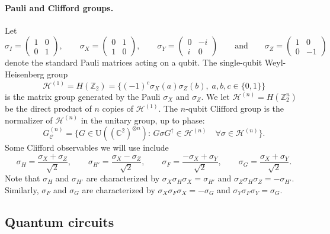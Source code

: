 \documentclass[11pt,letter]{article}
\theoremstyle{remark}
\theoremstyle{definition}
\newcommand{\setft}[1]{\mathrm{#1}}
\newcommand{\Unitary}{\setft{U}}
\newcommand{\C}{\ensuremath{\mathbb{C}}}
\newcommand{\Z}{\ensuremath{\mathbb{Z}}}
\newcommand{\heisg}{{\mathcal{H}^{(1)}}}
\newcommand{\heisgn}{{\mathcal{H}^{(n)}}}
\newcommand{\cliffordn}{G_\mathcal{C}^{(n)}}
\begin{document}
\paragraph{Pauli and Clifford groups.}
Let 
\begin{equation}\label{eq:pauli-matrix}
\sigma_I = \begin{pmatrix} 1 & 0 \\ 0 & 1 \end{pmatrix},\qquad \sigma_X = \begin{pmatrix} 0 & 1 \\ 1 & 0 \end{pmatrix},\qquad \sigma_Y = \begin{pmatrix} 0 & -i \\ i & 0 \end{pmatrix}\qquad\text{and}\qquad \sigma_Z = \begin{pmatrix} 1 & 0 \\ 0 & -1\end{pmatrix}
\end{equation}
denote the standard Pauli matrices acting on a qubit.  The single-qubit Weyl-Heisenberg group
$$\heisg = H(\Z_2)=\Big\{(-1)^c\sigma_X(a)\sigma_Z(b),\;a,b,c\in\{0,1\}\Big\} $$
is the matrix group generated by the Pauli $\sigma_X$ and $\sigma_Z$. We let $\heisgn = H(\Z_2^n)$ be the direct product of $n$ copies of $\heisg$.  
The $n$-qubit Clifford group is the normalizer of $\heisgn$ in the unitary group, up to phase: 
$$\cliffordn = \big\{G\in\Unitary((\C^2)^{\otimes n}):\, G \sigma G^\dagger \in \heisgn \quad\forall \sigma \in \heisgn\big\}.$$
Some Clifford observables we will use include 
\begin{equation}\label{eq:pauli-matrix-2}
 \sigma_H = \frac{\sigma_X+\sigma_Z}{\sqrt{2}},\qquad \sigma_{H'} = \frac{\sigma_X-\sigma_Z}{\sqrt{2}},\qquad \sigma_F = \frac{-\sigma_X+\sigma_Y}{\sqrt{2}},\qquad \sigma_{G} = \frac{\sigma_X+\sigma_Y}{\sqrt{2}}.
\end{equation}
Note that  $\sigma_H$ and $\sigma_{H'}$ are characterized by $\sigma_X \sigma_H \sigma_X = \sigma_{H'}$ and $\sigma_Z \sigma_H \sigma_Z = -\sigma_{H'}$. Similarly, $\sigma_F$ and $\sigma_G$ are characterized by $\sigma_X \sigma_F \sigma_X = -\sigma_G$ and $\sigma_Y \sigma_F \sigma_Y = \sigma_G$. 



\subsection{Quantum circuits} 
\end{document}
